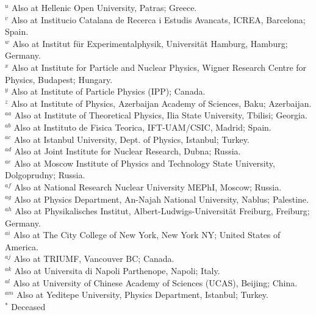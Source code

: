 \begin{flushleft}
$^{u}$ Also at Hellenic Open University, Patras; Greece.\\
$^{v}$ Also at Institucio Catalana de Recerca i Estudis Avancats, ICREA, Barcelona; Spain.\\
$^{w}$ Also at Institut f\"{u}r Experimentalphysik, Universit\"{a}t Hamburg, Hamburg; Germany.\\
$^{x}$ Also at Institute for Particle and Nuclear Physics, Wigner Research Centre for Physics, Budapest; Hungary.\\
$^{y}$ Also at Institute of Particle Physics (IPP); Canada.\\
$^{z}$ Also at Institute of Physics, Azerbaijan Academy of Sciences, Baku; Azerbaijan.\\
$^{aa}$ Also at Institute of Theoretical Physics, Ilia State University, Tbilisi; Georgia.\\
$^{ab}$ Also at Instituto de Fisica Teorica, IFT-UAM/CSIC, Madrid; Spain.\\
$^{ac}$ Also at Istanbul University, Dept. of Physics, Istanbul; Turkey.\\
$^{ad}$ Also at Joint Institute for Nuclear Research, Dubna; Russia.\\
$^{ae}$ Also at Moscow Institute of Physics and Technology State University, Dolgoprudny; Russia.\\
$^{af}$ Also at National Research Nuclear University MEPhI, Moscow; Russia.\\
$^{ag}$ Also at Physics Department, An-Najah National University, Nablus; Palestine.\\
$^{ah}$ Also at Physikalisches Institut, Albert-Ludwigs-Universit\"{a}t Freiburg, Freiburg; Germany.\\
$^{ai}$ Also at The City College of New York, New York NY; United States of America.\\
$^{aj}$ Also at TRIUMF, Vancouver BC; Canada.\\
$^{ak}$ Also at Universita di Napoli Parthenope, Napoli; Italy.\\
$^{al}$ Also at University of Chinese Academy of Sciences (UCAS), Beijing; China.\\
$^{am}$ Also at Yeditepe University, Physics Department, Istanbul; Turkey.\\
$^{*}$ Deceased

\end{flushleft}

